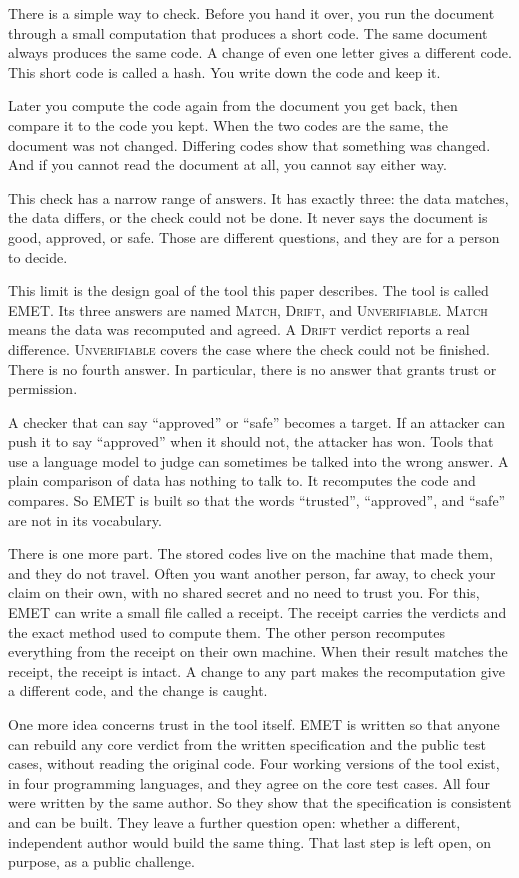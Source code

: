 \documentclass[11pt]{article}
\begin{document}
There is a simple way to check. Before you hand it over, you run the document through a small computation that produces a short code. The same document always produces the same code. A change of even one letter gives a different code. This short code is called a hash. You write down the code and keep it.

Later you compute the code again from the document you get back, then compare it to the code you kept. When the two codes are the same, the document was not changed. Differing codes show that something was changed. And if you cannot read the document at all, you cannot say either way.

This check has a narrow range of answers. It has exactly three: the data matches, the data differs, or the check could not be done. It never says the document is good, approved, or safe. Those are different questions, and they are for a person to decide.

This limit is the design goal of the tool this paper describes. The tool is called EMET. Its three answers are named \textsc{Match}, \textsc{Drift}, and \textsc{Unverifiable}. \textsc{Match} means the data was recomputed and agreed. A \textsc{Drift} verdict reports a real difference. \textsc{Unverifiable} covers the case where the check could not be finished. There is no fourth answer. In particular, there is no answer that grants trust or permission.

A checker that can say ``approved'' or ``safe'' becomes a target. If an attacker can push it to say ``approved'' when it should not, the attacker has won. Tools that use a language model to judge can sometimes be talked into the wrong answer. A plain comparison of data has nothing to talk to. It recomputes the code and compares. So EMET is built so that the words ``trusted'', ``approved'', and ``safe'' are not in its vocabulary.

There is one more part. The stored codes live on the machine that made them, and they do not travel. Often you want another person, far away, to check your claim on their own, with no shared secret and no need to trust you. For this, EMET can write a small file called a receipt. The receipt carries the verdicts and the exact method used to compute them. The other person recomputes everything from the receipt on their own machine. When their result matches the receipt, the receipt is intact. A change to any part makes the recomputation give a different code, and the change is caught.

One more idea concerns trust in the tool itself. EMET is written so that anyone can rebuild any core verdict from the written specification and the public test cases, without reading the original code. Four working versions of the tool exist, in four programming languages, and they agree on the core test cases. All four were written by the same author. So they show that the specification is consistent and can be built. They leave a further question open: whether a different, independent author would build the same thing. That last step is left open, on purpose, as a public challenge.
\end{document}
